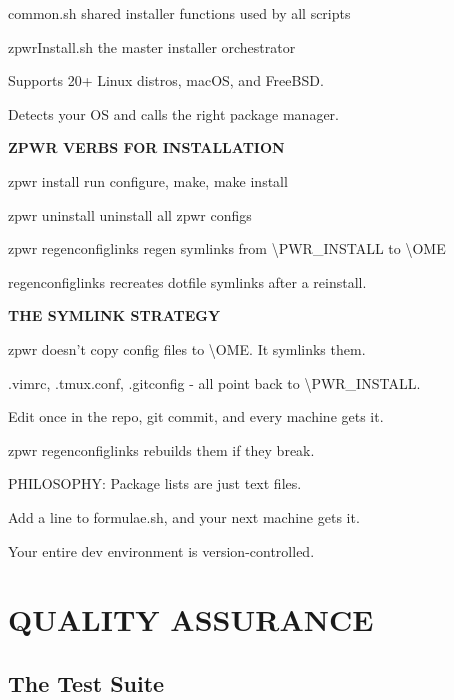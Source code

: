 \documentclass[11pt,a4paper,twoside]{book}
\begin{document}
common.sh  shared installer functions used by all scripts

zpwrInstall.sh  the master installer orchestrator

Supports 20+ Linux distros, macOS, and FreeBSD.

Detects your OS and calls the right package manager.


\vspace{12pt}
{\bfseries\color{neonyellow} ZPWR VERBS FOR INSTALLATION}\vspace{4pt}

zpwr install            run configure, make, make install

zpwr uninstall          uninstall all zpwr configs

zpwr regenconfiglinks   regen symlinks from \textbackslash{}PWR\_INSTALL to \textbackslash{}OME

regenconfiglinks recreates dotfile symlinks after a reinstall.


\vspace{12pt}
{\bfseries\color{neonyellow} THE SYMLINK STRATEGY}\vspace{4pt}

zpwr doesn't copy config files to \textbackslash{}OME. It symlinks them.

.vimrc, .tmux.conf, .gitconfig - all point back to \textbackslash{}PWR\_INSTALL.

Edit once in the repo, git commit, and every machine gets it.

\begin{codebox}
zpwr regenconfiglinks rebuilds them if they break.\\
\end{codebox}

PHILOSOPHY: Package lists are just text files.

Add a line to formulae.sh, and your next machine gets it.

Your entire dev environment is version-controlled.


\vspace{16pt}


\chapter{QUALITY ASSURANCE}

\section{The Test Suite}
\end{document}
